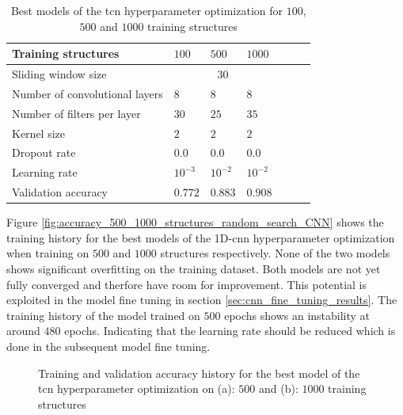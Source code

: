\documentclass[conference]{IEEEtran}
\begin{document}
\begin{table}[htp]
	\centering
	\caption{Best models of the \gls{tcn} hyperparameter optimization for $ 100 $, $ 500 $ and $ 1000 $ training structures}
	\label{tab:hyperparameters_100_500_1000_structures_TCN}
	\begin{tabular}{p{2.5cm}|llllll}
		Training structures & $ 100 $ & $ 500 $ & $ 1000 $ \\
		\hline
		Sliding window size & \multicolumn{3}{c}{$ 30 $} \\
		\hline
		Number of convolutional layers & $ 8 $ & $ 8 $ & $ 8 $ \\
		Number of filters per layer & $ 30 $ & $ 25 $ & $ 35 $ \\
		Kernel size & $ 2 $ & $ 2 $ & $ 2 $ \\
		Dropout rate & $ 0.0 $ & $ 0.0 $ & $ 0.0 $ \\
		Learning rate & $ 10^{-3} $ & $ 10^{-2} $ & $ 10^{-2} $ \\
		\hline
		Validation accuracy & $ 0.772 $ & $ 0.883 $ & $ 0.908 $
	\end{tabular}
\end{table}

Figure \ref{fig:accuracy_500_1000_structures_random_search_CNN} shows the training history for the best models of the 1D-\gls{cnn} hyperparameter optimization when training on $ 500 $ and $ 1000 $ structures respectively. None of the two models shows significant overfitting on the training dataset. Both models are not yet fully converged and therfore have room for improvement. This potential is exploited in the model fine tuning in section \ref{sec:cnn_fine_tuning_results}. The training history of the model trained on $ 500 $ epochs shows an instability at around $ 480 $ epochs. Indicating that the learning rate should be reduced which is done in the subsequent model fine tuning.

\begin{figure}[htp]
	\centering
	\quad
	\caption{Training and validation accuracy history for the best model of the \gls{tcn} hyperparameter optimization on (a): $ 500 $ and (b): $ 1000 $ training structures}
	\label{fig:accuracy_500_1000_structures_random_search_TCN}
\end{figure}
\end{document}
